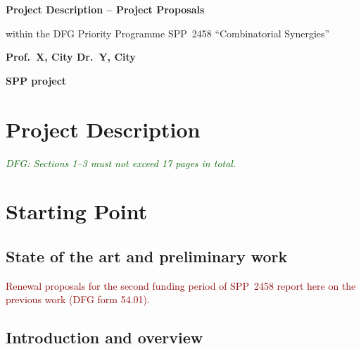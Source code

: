 \documentclass[a4paper,11pt]{amsart}
\theoremstyle{definition}
\newcommand{\<}{\langle}
\renewcommand{\>}{\rangle}
\newcommand{\dfg}[1]{\emph{\textcolor{darkgreen}{DFG: #1}}}
\newcommand{\tk}[1]{\textcolor{darkred}{#1}}
\begin{document}
\thispagestyle{dfg}  %

\begin{center}
  {\large\bfseries Project Description -- Project Proposals\par}
  within the DFG Priority Programme SPP~2458 ``Combinatorial
  Synergies''

  \bigskip
  {\bfseries Prof.~X, City \quad Dr.~Y, City\par}

  \bigskip
  {\Large\bfseries SPP project\par}
\end{center}


\section*{Project Description}

\dfg{Sections 1--3 must not exceed 17 pages in total.}

\section{Starting Point} \label{sec:start}

\subsection*{State of the art and preliminary work}
\tk{Renewal proposals for the second funding period of SPP~2458
  report here on the previous work (DFG form 54.01).}

\lipsum[2]

\subsection{Introduction and overview}
\end{document}

